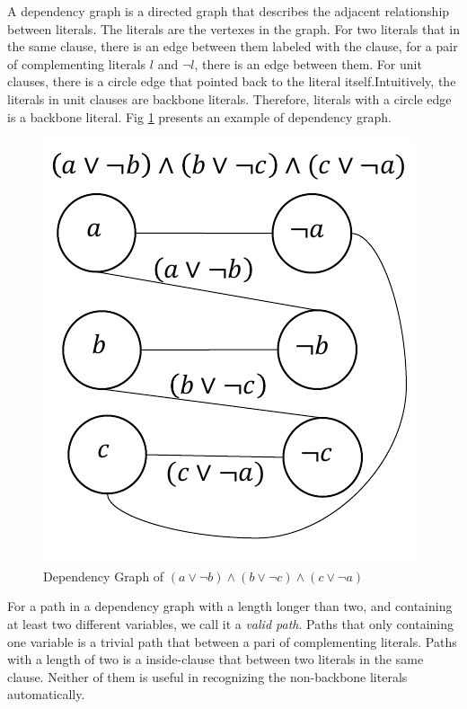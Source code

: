  A dependency graph is a directed graph that describes the adjacent relationship between literals. The literals are the vertexes in the graph. For two literals that in the same clause, there is an edge between them labeled with the clause, for a pair of complementing literals $l$ and $\neg l$, there is an edge between them. For unit clauses, there is a circle edge that pointed back to the literal itself.Intuitively, the literals in unit clauses are backbone literals. Therefore, literals with a circle edge is a backbone literal. Fig \ref{fig:depend} presents an example of dependency graph.
 \begin{figure}
    \centering
    \includegraphics[scale=0.7]{dpendency.pdf}
   \caption{Dependency Graph of $(a\vee\neg b)\wedge(b\vee\neg c)\wedge(c\vee\neg a)$}
   \label{fig:depend}
\end{figure}

 For a path in a dependency graph with a length longer than two, and containing at least two different variables, we call it a \emph{valid path}. Paths that only containing one variable is a trivial path that between a pari of complementing literals. Paths with a length of two is a inside-clause that between two literals in the same clause. Neither of them is useful in recognizing the non-backbone literals automatically.


